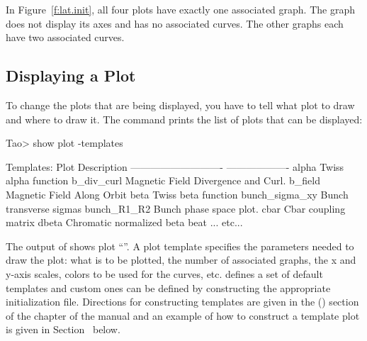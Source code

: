 \documentclass{hitec}     %
\begin{document}
In Figure~\ref{f:lat.init}, all four plots have exactly one associated graph. The 
graph does not display its axes and has no associated curves. The other graphs each have two
associated curves.

\subsection{Displaying a Plot}
\label{s:disp.plot}

To change the plots that are being displayed, you have to tell \tao what plot to draw and where to draw it.
The  command prints the list of plots that can be displayed:
\begin{code}
Tao> show plot -templates

Templates:
   Plot                                    Description
   ----------------------------            -------------------
   alpha                                   Twiss alpha function
   b_div_curl                              Magnetic Field Divergence and Curl.
   b_field                                 Magnetic Field Along Orbit
   beta                                    Twiss beta function
   bunch_sigma_xy                          Bunch transverse sigmas
   bunch_R1_R2                             Bunch phase space plot.
   cbar                                    Cbar coupling matrix
   dbeta                                   Chromatic normalized beta beat
... etc...
\end{code}
The output of  shows plot ``''.  A plot template specifies
the parameters needed to draw the plot: what is to be plotted, the number of associated graphs, the
x and y-axis scales, colors to be used for the curves, etc. \tao defines a set of default templates
and custom ones can be defined by constructing the appropriate initialization file. Directions for
constructing templates are given in the  () section
of the  chapter of the \tao manual and an example of how to construct a
template plot is given in Section~ below.

\end{document}
